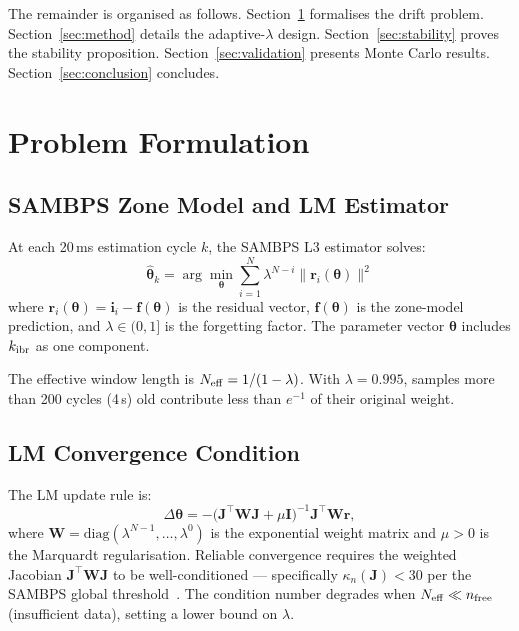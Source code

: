\documentclass[journal]{IEEEtran}
\newcommand{\kibr}{k_{\rm ibr}}
\newcommand{\Neff}{N_{\rm eff}}
\newcommand{\kappan}{\kappa_n}
\begin{document}
The remainder is organised as follows.
Section~\ref{sec:problem} formalises the drift problem.
Section~\ref{sec:method} details the adaptive-$\lambda$ design.
Section~\ref{sec:stability} proves the stability proposition.
Section~\ref{sec:validation} presents Monte Carlo results.
Section~\ref{sec:conclusion} concludes.

\section{Problem Formulation}
\label{sec:problem}

\subsection{SAMBPS Zone Model and LM Estimator}

At each 20\,ms estimation cycle $k$, the SAMBPS L3 estimator solves:
\begin{equation}
  \hat{\bm{\theta}}_k = \arg\min_{\bm{\theta}}
  \sum_{i=1}^{N} \lambda^{N-i}
  \bigl\|\mathbf{r}_i(\bm{\theta})\bigr\|^2
  \label{eq:wls}
\end{equation}
where $\mathbf{r}_i(\bm{\theta}) = \mathbf{i}_i - \mathbf{f}(\bm{\theta})$
is the residual vector, $\mathbf{f}(\bm{\theta})$ is the zone-model
prediction, and $\lambda \in (0, 1]$ is the forgetting factor.  The
parameter vector $\bm{\theta}$ includes $\kibr$ as one component.

The effective window length is $\Neff = 1/(1-\lambda)$.  With
$\lambda = 0.995$, samples more than 200 cycles (4\,s) old contribute
less than $e^{-1}$ of their original weight.

\subsection{LM Convergence Condition}

The LM update rule is:
\begin{equation}
  \Delta\bm{\theta} = -\bigl(\mathbf{J}^\top \mathbf{W} \mathbf{J}
    + \mu \mathbf{I}\bigr)^{-1} \mathbf{J}^\top \mathbf{W}\mathbf{r},
  \label{eq:lm}
\end{equation}
where $\mathbf{W} = \mathrm{diag}(\lambda^{N-1},\ldots,\lambda^0)$ is
the exponential weight matrix and $\mu > 0$ is the Marquardt
regularisation.  Reliable convergence requires the weighted Jacobian
$\mathbf{J}^\top\mathbf{W}\mathbf{J}$ to be well-conditioned — specifically
$\kappan(\mathbf{J}) < 30$ per the SAMBPS global threshold~\cite{SAMBP_TR65}.
The condition number degrades when $\Neff \ll n_{\rm free}$
(insufficient data), setting a lower bound on $\lambda$.
\end{document}
